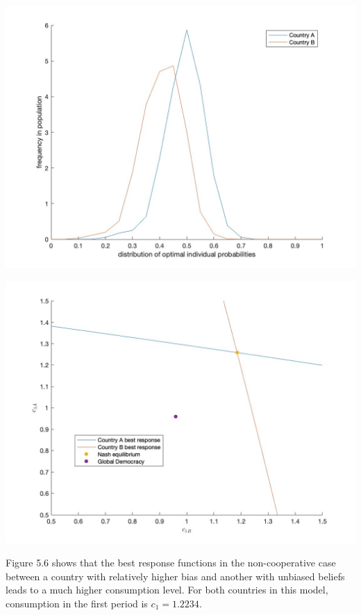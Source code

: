 \documentclass[11pt,preprint, authoryear]{elsarticle}
\let\origfigure\figure
\let\endorigfigure\endfigure
\renewenvironment{figure}[1][2] {
    \expandafter\origfigure\expandafter[H]
} {
    \endorigfigure
}
\numberwithin{equation}{section}
\numberwithin{figure}{section}
\numberwithin{table}{section}
\begin{document}
\begin{figure}[H]

{\centering \includegraphics[width=0.75\linewidth]{images/Fig4_0.5Size0.9Bias} 

}

\caption{Asymmetric country bias model: Kernel density function of the distribution of the optimal probabilty of crisis and frequency thereof across individuals in country A and country B}\label{fig:Fig 5.5}
\end{figure}
\begin{figure}[H]

{\centering \includegraphics[width=0.75\linewidth]{images/Fig2_0.5Size0.9Bias} 

}

\caption{Best response functions for assymetric bias model compared to global democracy}\label{fig:Fig 5.6}
\end{figure}

Figure 5.6 shows that the best response functions in the non-cooperative
case between a country with relatively higher bias and another with
unbiased beliefs leads to a much higher consumption level. For both
countries in this model, consumption in the first period is
\(c_1=1.2234\).
\end{document}
